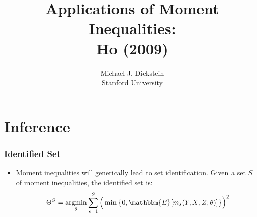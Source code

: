 \documentclass[notes=show]{beamer}
\begin{document}
\title[Moment Inequalities]{Applications of Moment Inequalities:\\ Ho (2009) }
\author[MJ Dickstein]{Michael J. Dickstein \\
Stanford University}
\maketitle


\section{Inference}


\begin{frame}
\frametitle{Identified Set}

\begin{itemize}
\item Moment inequalities will generically lead to set identification. Given
a set $S$ of moment inequalities, the identified set is:  
\begin{equation*}
\Theta^{S}=\operatornamewithlimits{argmin}_{\theta}\sum_{s=1}^{S}\Big(\min%
\big\{0,\mathbbm{E}[m_{s}(Y,X,Z;\theta)]\big\}\Big)^{2}
\end{equation*}
\begin{figure}[h!]
\begin{center}
   
\end{center}
\end{figure}
\end{itemize}
\end{frame}
\end{document}
